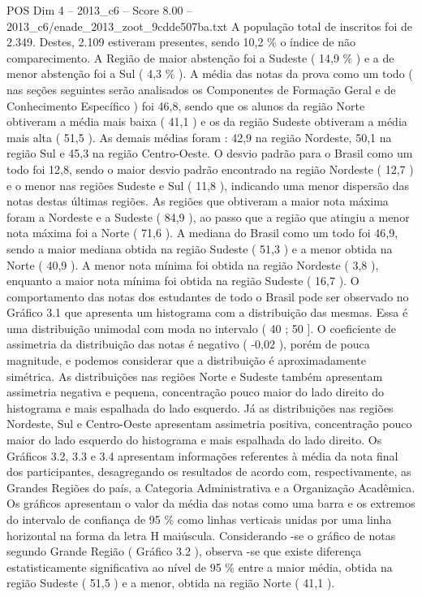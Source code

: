 \begin{textsample}{POS Dim 4 – 2013\_c6 – Score 8.00 – 2013\_c6/enade\_2013\_zoot\_9cdde507ba.txt}
A população total de inscritos foi de 2.349.
Destes, 2.109 estiveram presentes, sendo 10,2 \% o índice de não comparecimento.
A Região de maior abstenção foi a Sudeste ( 14,9 \% ) e a de menor abstenção foi a Sul ( 4,3 \% ).
A média das notas da prova como um todo ( nas seções seguintes serão analisados os Componentes de Formação Geral e de Conhecimento Específico ) foi 46,8, sendo que os alunos da região Norte obtiveram a média mais baixa ( 41,1 ) e os da região Sudeste obtiveram a média mais alta ( 51,5 ).
As demais médias foram : 42,9 na região Nordeste, 50,1 na região Sul e 45,3 na região Centro-Oeste.
O desvio padrão para o Brasil como um todo foi 12,8, sendo o maior desvio padrão encontrado na região Nordeste ( 12,7 ) e o menor nas regiões Sudeste e Sul ( 11,8 ), indicando uma menor dispersão das notas destas últimas regiões.
As regiões que obtiveram a maior nota máxima foram a Nordeste e a Sudeste ( 84,9 ), ao passo que a região que atingiu a menor nota máxima foi a Norte ( 71,6 ).
A mediana do Brasil como um todo foi 46,9, sendo a maior mediana obtida na região Sudeste ( 51,3 ) e a menor obtida na Norte ( 40,9 ).
A menor nota mínima foi obtida na região Nordeste ( 3,8 ), enquanto a maior nota mínima foi obtida na região Sudeste ( 16,7 ).
O comportamento das notas dos estudantes de todo o Brasil pode ser observado no Gráfico 3.1 que apresenta um histograma com a distribuição das mesmas.
Essa é uma distribuição unimodal com moda no intervalo ( 40 ; 50 ].
O coeficiente de assimetria da distribuição das notas é negativo ( -0,02 ), porém de pouca magnitude, e podemos considerar que a distribuição é aproximadamente simétrica.
As distribuições nas regiões Norte e Sudeste também apresentam assimetria negativa e pequena, concentração pouco maior do lado direito do histograma e mais espalhada do lado esquerdo.
Já as distribuições nas regiões Nordeste, Sul e Centro-Oeste apresentam assimetria positiva, concentração pouco maior do lado esquerdo do histograma e mais espalhada do lado direito.
Os Gráficos 3.2, 3.3 e 3.4 apresentam informações referentes à média da nota final dos participantes, desagregando os resultados de acordo com, respectivamente, as Grandes Regiões do país, a Categoria Administrativa e a Organização Acadêmica.
Os gráficos apresentam o valor da média das notas como uma barra e os extremos do intervalo de confiança de 95 \% como linhas verticais unidas por uma linha horizontal na forma da letra H maiúscula.
Considerando -se o gráfico de notas segundo Grande Região ( Gráfico 3.2 ), observa -se que existe diferença estatisticamente significativa ao nível de 95 \% entre a maior média, obtida na região Sudeste ( 51,5 ) e a menor, obtida na região Norte ( 41,1 ).

\end{textsample}
